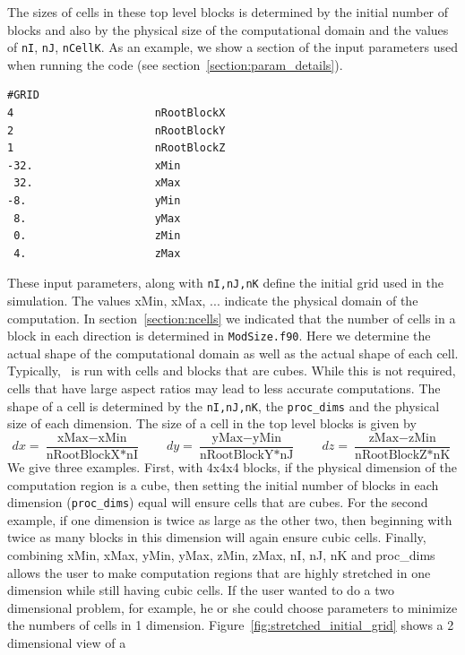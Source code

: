 The sizes of cells in these top level blocks is determined
by the initial number of blocks and
also by the physical size of the computational domain and the 
values of {\tt nI}, {\tt nJ}, {\tt nCellK}.
As an example, we show
a section of the input parameters used when running the code (see 
section~\ref{section:param_details}).
\begin{verbatim}
#GRID        
4                      nRootBlockX
2                      nRootBlockY
1                      nRootBlockZ
-32.                   xMin
 32.                   xMax
-8.                    yMin
 8.                    yMax
 0.                    zMin
 4.                    zMax
\end{verbatim}
These input parameters, along with  
{\tt nI,nJ,nK} define the initial grid used in the simulation.
The values xMin, xMax, ... indicate the physical 
domain of the computation.  In section~\ref{section:ncells}
we indicated that the number of cells in a block in each direction is determined
in {\tt ModSize.f90}.  Here we determine the actual shape of the computational
domain as well as the actual shape of each cell. Typically, \BATSRUS\ is
run with cells and blocks that are cubes.  While this is not required, 
cells that have large aspect ratios may lead to less accurate computations.  
The shape of a cell is
determined by the {\tt nI,nJ,nK}, the {\tt proc\_dims} and the physical size of 
each dimension. The size of a cell in the top level blocks is given by 
\begin{equation}
  dx = \frac{ \mbox{xMax}-\mbox{xMin} }{\mbox{nRootBlockX}*\mbox{nI}} \qquad
  dy = \frac{ \mbox{yMax}-\mbox{yMin} }{\mbox{nRootBlockY}*\mbox{nJ}} \qquad
  dz = \frac{ \mbox{zMax}-\mbox{zMin} }{\mbox{nRootBlockZ}*\mbox{nK}}
\end{equation}
We give three examples.
First, with 4x4x4 blocks, if the physical dimension
of the computation region is a cube, then setting the initial number of blocks
in each dimension ({\tt proc\_dims}) equal will ensure cells that are cubes.  
For the second example, if one dimension is twice
as large as the other two, then beginning with twice as many blocks in this dimension
will again ensure cubic cells.  
Finally, combining xMin, xMax, yMin, yMax, zMin, zMax, nI, nJ, nK and proc\_dims 
allows the user to make computation
regions that are highly stretched in one dimension while still having
cubic cells.  If the user wanted to do a two dimensional problem, for example,
he or she could choose parameters to minimize the numbers of cells in 1 dimension.
Figure~\ref{fig:stretched_initial_grid} shows a 2 dimensional view of a 
